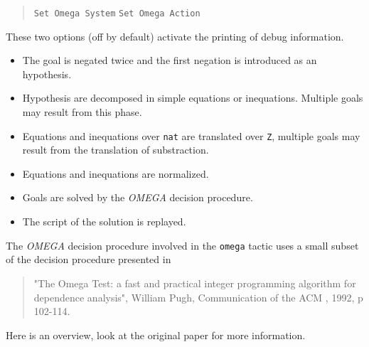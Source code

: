 \begin{quote}
  {\tt Set Omega System}
  {\tt Set Omega Action}
\end{quote}
These two options (off by default) activate the printing of debug
information.

\label{technical}

\begin{itemize}

\item The goal is negated twice and the first negation is introduced as an
     hypothesis.
\item Hypothesis are decomposed in simple equations or inequations. Multiple
     goals may result from this phase.
\item Equations and inequations over \verb=nat= are translated over
     \verb=Z=, multiple goals may result from the translation of
     substraction.
\item Equations and inequations are normalized.
\item Goals are solved by the {\it OMEGA} decision procedure.
\item The script of the solution is replayed.

\end{itemize}


The {\it OMEGA} decision procedure involved in the {\tt omega} tactic uses
a small subset of the decision procedure presented in

\begin{quote}
  "The Omega Test: a fast and practical integer programming
algorithm for dependence analysis", William Pugh, Communication of the
ACM , 1992, p 102-114.
\end{quote}

Here is an overview, look at the original paper for more information.

